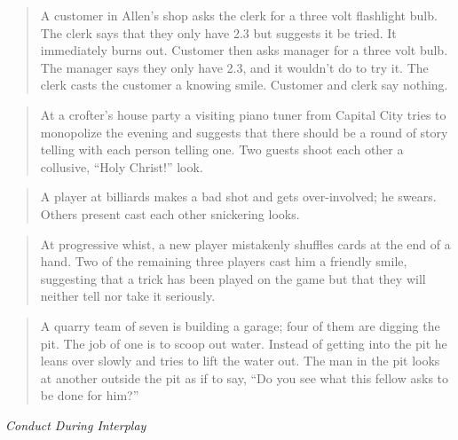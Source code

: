 \documentclass[openany,nobib]{tufte-book}
\begin{document}
\begin{quote}
A customer in Allen's shop asks the clerk for a three volt flashlight
bulb. The clerk says that they only have 2.3 but suggests it be tried.
It immediately burns out. Customer then asks manager for a three volt
bulb. The manager says they only have 2.3, and it wouldn't do to try it.
The clerk casts the customer a knowing smile. Customer and clerk say
nothing.
\end{quote}

\begin{quote}
At a crofter's house party a visiting piano tuner from Capital City
tries to monopolize the evening and suggests that there should be a
round of story telling with each person telling one. Two guests shoot
each other a collusive, ``Holy Christ!'' look.
\end{quote}

\begin{quote}
A player at billiards makes a bad shot and gets over-involved; he
swears. Others present cast each other snickering looks.
\end{quote}

\begin{quote}
At progressive whist, a new player mistakenly shuffles cards at the end
of a hand. Two of the remaining three players cast him a friendly smile,
suggesting that a trick has been played on the game but that they will
neither tell nor take it seriously.
\end{quote}

\begin{quote}
A quarry team of seven is building a garage; four of them are digging
the pit. The job of one is to scoop out water. Instead of getting into
the pit he leans over slowly and tries to lift the water out. The man in
the pit looks at another outside the pit as if to say, ``Do you see what
this fellow asks to be done for him?''
\end{quote}


\newpage
\thispagestyle{empty}
\begin{fullwidth}

\begin{center}
\vspace*{3in}

{\fontsize{35}{24}\selectfont{Part Five}\par}

\vspace{1in}

{\fontsize{35}{24}\selectfont\textit{Conduct During Interplay}\par}

\end{center}

\end{fullwidth}
\end{document}
